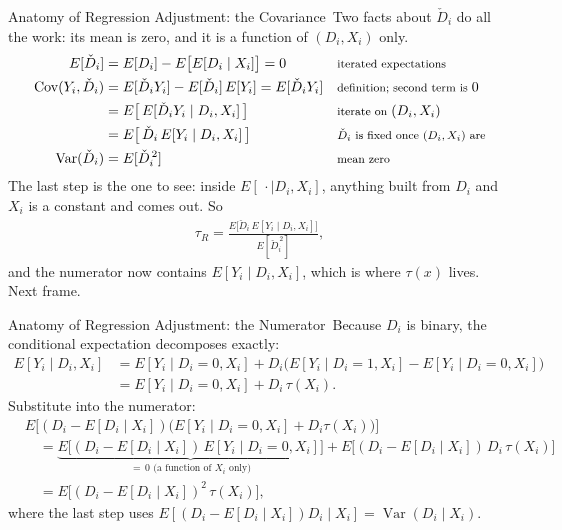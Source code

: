 \documentclass[aspectratio=169,11pt,xcolor=dvipsnames]{beamer}
\DeclareMathOperator{\Cov}{Cov}
\DeclareMathOperator{\Var}{Var}
\newcommand{\E}{E}
\newcommand{\adv}{\,\raisebox{0.6pt}{\textcolor{accent}{$\bigstar$}}}
\begin{document}
\begin{frame}{Anatomy of Regression Adjustment: the Covariance\adv}
Two facts about $\check D_i$ do all the work: its mean is zero, and it is a
function of $(D_i, X_i)$ only.
\begin{align*}
  \E[\check D_i]
  &= \E[D_i] - \E\big[\E[D_i\mid X_i]\big] = 0
  && \text{\footnotesize iterated expectations} \\
  \Cov(Y_i,\check D_i)
  &= \E[\check D_i Y_i] - \E[\check D_i]\,\E[Y_i] = \E[\check D_i Y_i]
  && \text{\footnotesize definition; second term is } 0 \\
  &= \E\big[\,\E[\check D_i Y_i \mid D_i, X_i]\,\big]
  && \text{\footnotesize iterate on } (D_i,X_i) \\
  &= \E\big[\,\check D_i\,\E[Y_i \mid D_i, X_i]\,\big]
  && \text{\footnotesize $\check D_i$ is fixed once $(D_i,X_i)$ are} \\
  \Var(\check D_i)
  &= \E[\check D_i^{\,2}]
  && \text{\footnotesize mean zero}
\end{align*}
The last step is the one to see: inside $\E[\,\cdot\mid D_i,X_i]$, anything
built from $D_i$ and $X_i$ is a constant and comes out. So
\begin{align*}
  \tau_R = \frac{\E\big[\check D_i\,\E[Y_i\mid D_i,X_i]\big]}{\E[\check D_i^{\,2}]} ,
\end{align*}
and the numerator now contains $\E[Y_i\mid D_i,X_i]$, which is where $\tau(x)$
lives. Next frame.
\end{frame}

\begin{frame}{Anatomy of Regression Adjustment: the Numerator\adv}
Because $D_i$ is binary, the conditional expectation decomposes exactly:
\begin{align*}
  \E[Y_i\mid D_i,X_i]
  &= \E[Y_i\mid D_i=0,X_i]
   + D_i\Big(\E[Y_i\mid D_i=1,X_i]-\E[Y_i\mid D_i=0,X_i]\Big) \\
  &= \E[Y_i\mid D_i=0,X_i] + D_i\,\tau(X_i) .
\end{align*}
\pause
Substitute into the numerator:
\begin{align*}
  &\E\Big[(D_i - \E[D_i\mid X_i])\big(\E[Y_i\mid D_i=0,X_i] + D_i\tau(X_i)\big)\Big] \\
  &\quad= \underbrace{\E\Big[(D_i-\E[D_i\mid X_i])\,\E[Y_i\mid D_i=0,X_i]\Big]}_{=\,0
     \text{ (a function of } X_i \text{ only)}}
   + \E\Big[(D_i-\E[D_i\mid X_i])\,D_i\,\tau(X_i)\Big] \\[2pt]
  &\quad= \E\Big[(D_i - \E[D_i\mid X_i])^2\,\tau(X_i)\Big] ,
\end{align*}
where the last step uses $\E[(D_i-\E[D_i\mid X_i])D_i \mid X_i]
= \Var(D_i\mid X_i)$.
\end{frame}
\end{document}
